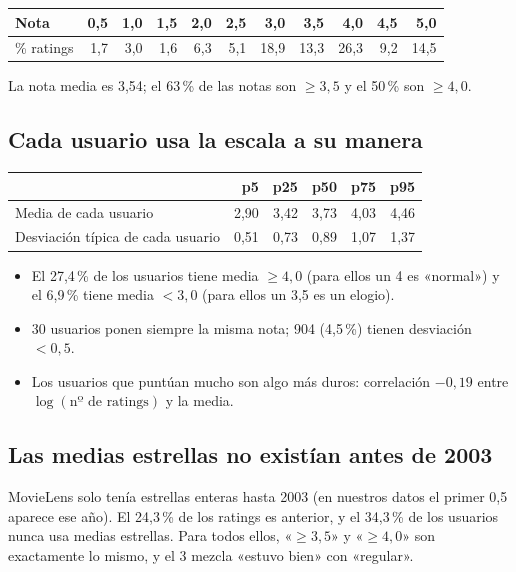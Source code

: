 \documentclass[a4paper,11pt]{article}
\begin{document}
\begin{center}
\begin{tabular}{lrrrrrrrrrr}
\toprule
Nota & 0,5 & 1,0 & 1,5 & 2,0 & 2,5 & 3,0 & 3,5 & 4,0 & 4,5 & 5,0 \\
\midrule
\% ratings & 1,7 & 3,0 & 1,6 & 6,3 & 5,1 & 18,9 & 13,3 & 26,3 & 9,2 & 14,5 \\
\bottomrule
\end{tabular}
\end{center}
La nota media es 3,54; el 63\,\% de las notas son $\ge 3{,}5$ y el 50\,\% son $\ge 4{,}0$.

\subsection{Cada usuario usa la escala a su manera}
\begin{center}
\begin{tabular}{lrrrrr}
\toprule
 & p5 & p25 & p50 & p75 & p95 \\
\midrule
Media de cada usuario & 2,90 & 3,42 & 3,73 & 4,03 & 4,46 \\
Desviación típica de cada usuario & 0,51 & 0,73 & 0,89 & 1,07 & 1,37 \\
\bottomrule
\end{tabular}
\end{center}
\begin{itemize}
  \item El 27,4\,\% de los usuarios tiene media $\ge 4{,}0$ (para ellos un 4 es «normal») y el 6,9\,\% tiene media $< 3{,}0$
        (para ellos un 3,5 es un elogio).
  \item 30 usuarios ponen siempre la misma nota; 904 (4,5\,\%) tienen desviación $< 0{,}5$.
  \item Los usuarios que puntúan mucho son algo más duros: correlación $-0{,}19$ entre $\log(\text{nº de ratings})$ y la media.
\end{itemize}

\subsection{Las medias estrellas no existían antes de 2003}
MovieLens solo tenía estrellas enteras hasta 2003 \cite{harper2015} (en nuestros datos el primer 0,5 aparece ese año). El 24,3\,\% de los
ratings es anterior, y el 34,3\,\% de los usuarios nunca usa medias estrellas. Para todos ellos, «$\ge 3{,}5$» y
«$\ge 4{,}0$» son exactamente lo mismo, y el 3 mezcla «estuvo bien» con «regular».
\end{document}

